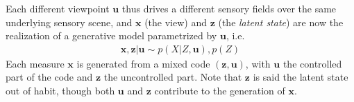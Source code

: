 \documentclass{article}
\begin{document}
Each different viewpoint $\boldsymbol{u}$ thus drives a different sensory fields over the same underlying sensory scene, and $\boldsymbol{x}$ (the view) and $\boldsymbol{z}$ (the \emph{latent state}) are now the realization of a generative model parametrized by $\boldsymbol{u}$, i.e.
\begin{align}
\boldsymbol{x}, \boldsymbol{z} | \boldsymbol{u} \sim p(X|Z, \boldsymbol{u}), p(Z)
\end{align}  
Each measure $\boldsymbol{x}$ is generated from a mixed code $(\boldsymbol{z}, \boldsymbol{u})$, with $\boldsymbol{u}$ the controlled part of the code and  $\boldsymbol{z}$ the uncontrolled part. %
Note that $\boldsymbol{z}$ is said the latent state out of habit, though both $\boldsymbol{u}$ and $\boldsymbol{z}$ contribute to the generation of $\boldsymbol{x}$.

\end{document}

